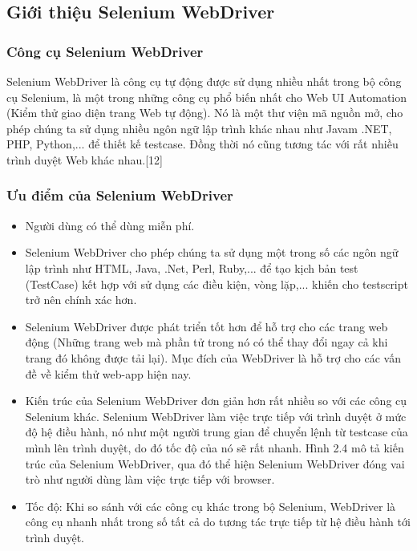 \subsection{Giới thiệu Selenium WebDriver}
\subsubsection{Công cụ Selenium WebDriver}

Selenium WebDriver là công cụ tự động được sử dụng nhiều nhất trong bộ công cụ Selenium, là một trong những công cụ phổ biến nhất cho Web UI Automation (Kiểm thử giao diện trang Web tự động). Nó là một thư viện mã nguồn mở, cho phép chúng ta sử dụng nhiều ngôn ngữ lập trình khác nhau như Javam .NET, PHP, Python,... để thiết kế testcase. Đồng thời nó cũng tương tác với rất nhiều trình duyệt Web khác nhau.[12]

\subsubsection{Ưu điểm của Selenium WebDriver}

\begin{itemize}
	\item Người dùng có thể dùng miễn phí.
	
	\item Selenium WebDriver cho phép chúng ta sử dụng một trong số các ngôn ngữ lập trình như HTML, Java, .Net, Perl, Ruby,... để tạo kịch bản test (TestCase) kết hợp với sử dụng các điều kiện, vòng lặp,... khiến cho testscript trở nên chính xác hơn.
	
	\item Selenium WebDriver được phát triển tốt hơn để hỗ trợ cho các trang web động (Những trang web mà phần tử trong nó có thể thay đổi ngay cả khi trang đó không được tải lại). Mục đích của WebDriver là hỗ trợ cho các vấn đề về kiểm thử web-app hiện nay.
	
	\item Kiến trúc của Selenium WebDriver đơn giản hơn rất nhiều so với các công cụ Selenium khác. Selenium WebDriver làm việc trực tiếp với trình duyệt ở mức độ hệ điều hành, nó như một người trung gian để chuyển lệnh từ testcase của mình lên trình duyệt, do đó tốc độ của nó sẽ rất nhanh. Hình 2.4 mô tả kiến trúc của Selenium WebDriver, qua đó thể hiện Selenium WebDriver đóng vai trò như người dùng làm việc trực tiếp với browser.
	
	\item Tốc độ: Khi so sánh với các công cụ khác trong bộ Selenium, WebDriver là công cụ nhanh nhất trong số tất cả do tương tác trực tiếp từ hệ điều hành tới trình duyệt. 
\end{itemize}


